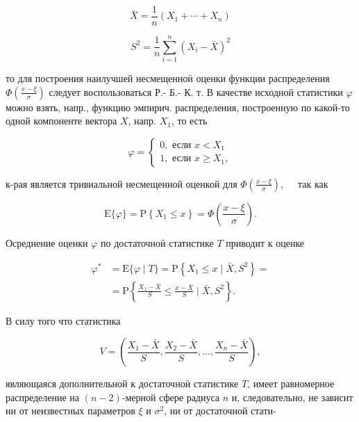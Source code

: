 \documentclass[10pt]{article}
\begin{document}
\[

\bar{X}=\frac{1}{n}\left(X_{1}+\cdots+X_{n}\right)

\]



\[

S^{2}=\frac{1}{n} \sum_{i=1}^{n}\left(X_{i}-\bar{X}\right)^{2}

\]



то для построения наилучшей несмещенноӥ оценки функции распределения $\Phi\left(\frac{x-\xi}{\sigma}\right)$ следует воспользоваться Р.- Б.- К. т. В качестве исходной статистики $\varphi$ можно взять, напр., функцию эмпирич. распределения, построенную по какой-то одной компоненте вектора $X$, напр. $X_{1}$, то есть



\[

\varphi=\left\{\begin{array}{l}

0, \text { если } x<X_{1} \\

1, \text { если } x \geqslant X_{1},

\end{array}\right.

\]



к-рая является тривиальной несмещенной оценкой для $\Phi\left(\frac{x-\xi}{\sigma}\right), \quad$ так как



\[

\mathrm{E}\{\varphi\}=\mathrm{P}\left\{X_{1} \leqslant x\right\}=\Phi\left(\frac{x-\xi}{\sigma}\right) .

\]



Осреднение оценки $\varphi$ по достаточноӥ статистике $T$ приводит к оценке



\[

\begin{aligned}

\varphi^{*} & =\mathrm{E}\{\varphi \mid T\}=\mathrm{P}\left\{X_{1} \leqslant x \mid \bar{X}, S^{2}\right\}= \\

& =\mathrm{P}\left\{\frac{X_{1}-\bar{X}}{S} \leqslant \frac{x-\bar{X}}{S} \mid \bar{X}, S^{2}\right\} .

\end{aligned}

\]



В силу того что статистика



\[

V=\left(\frac{X_{1}-\bar{X}}{S}, \frac{X_{2}-\bar{X}}{S}, \ldots, \frac{X_{n}-\bar{X}}{S}\right),

\]



являющаяся дополнительной к достаточноӥ статистике $T$, имеет равномерное распределение на $(n-2)$-мерной сфере радиуса $n$ и, следовательно, не зависит ни от неизвестных параметров $\xi$ и $\sigma^{2}$, ни от достаточной стати-
\end{document}
